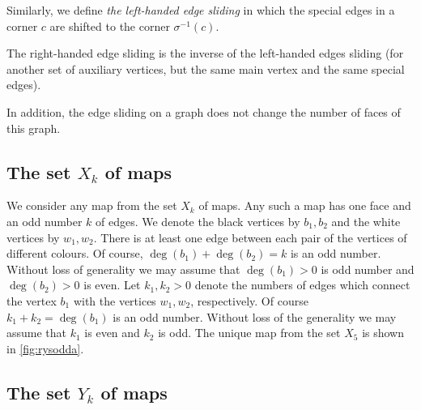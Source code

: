 \documentclass[submission]{FPSAC2021}
\DeclareMathOperator{\degg}{deg}
\newcommand{\nast}
{
	\sigma
}
\begin{document}


\medskip

Similarly, we define \emph{the left-handed edge sliding} 
in which the special edges in a corner $c$ are shifted to the corner $\nast^{-1}(c)$. 

The right-handed edge sliding is the inverse of the left-handed edges
sliding (for another set of auxiliary vertices, but the same main vertex and the same special edges).

In addition, the edge sliding on a graph does not change the
number of faces of this graph.  

\subsection{The set $X_k$ of maps} 

We consider any map from the set $X_k$ of maps. Any such a
map has one face and an odd number $k$ of edges. We denote the black
vertices by $b_1, b_2$ and the white vertices by $w_1, w_2$. There is
at least one edge between each pair of the vertices of different colours.
Of course, $\degg(b_1)+\degg(b_2)=k$ is an odd number. Without loss of generality 
we may assume that $\degg(b_1)>0$ is odd number and $\degg(b_2)>0$ is even.
Let $k_1, k_2 > 0$ denote the numbers of edges which connect
the vertex $b_1$ with the vertices $w_1, w_2$, respectively. 
Of course $k_1+k_2=\degg(b_1)$ is an odd number. Without loss of the generality 
we may assume that $k_1$ is
even and $k_2$ is odd. The unique map from the
set $X_5$ is shown in \cref{fig:rysodda}.

\subsection{The set $Y_k$ of maps}
\end{document}
